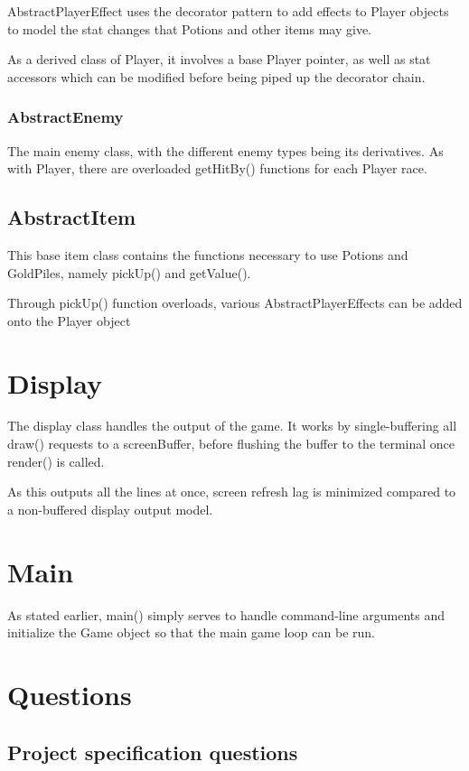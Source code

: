 \documentclass{article}
\begin{document}
AbstractPlayerEffect uses the decorator pattern to add effects to Player objects to model the stat changes that Potions and other items may give. 

As a derived class of Player, it involves a base Player pointer, as well as stat accessors which can be modified before being piped up the decorator chain.

\subsubsection{AbstractEnemy}

The main enemy class, with the different enemy types being its derivatives. As with Player, there are overloaded getHitBy() functions for each Player race.

\subsection{AbstractItem}

This base item class contains the functions necessary to use Potions and GoldPiles, namely pickUp() and getValue().

Through pickUp() function overloads, various AbstractPlayerEffects can be added onto the Player object 

\section{Display}

The display class handles the output of the game. It works by single-buffering all draw() requests to a screenBuffer, before flushing the buffer to the terminal once render() is called.

As this outputs all the lines at once, screen refresh lag is minimized compared to a non-buffered display output model.

\section{Main}

As stated earlier, main() simply serves to handle command-line arguments and initialize the Game object so that the main game loop can be run.

\section{Questions}

\subsection{Project specification questions}
\end{document}
